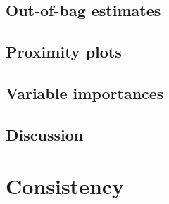 \subsection{Out-of-bag estimates}

\subsection{Proximity plots}

\subsection{Variable importances}

\subsection{Discussion}

%


\section{Consistency}
\label{sec:4:consistency}

